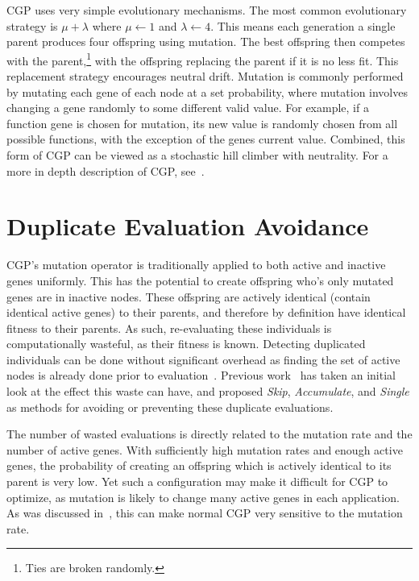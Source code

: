 \documentclass[journal]{IEEEtran}
\begin{document}
CGP uses very simple evolutionary mechanisms.  The most common evolutionary strategy
is $\mu + \lambda$ where $\mu \leftarrow 1$ and $\lambda \leftarrow 4$.
This means each generation a single parent produces four offspring using
mutation.  The best offspring then competes with the parent,\footnote{Ties are broken
randomly.} with the offspring
replacing the parent if it is no less fit.  This replacement strategy encourages
neutral drift.  Mutation
is commonly performed by mutating each gene of each node at a set probability, where mutation
involves changing a gene randomly to some different valid value.  For example,
if a function gene is chosen for mutation, its new value is randomly chosen from
all possible functions, with the exception of the genes current value.  Combined,
this form of CGP can be viewed as a stochastic hill climber with neutrality.
For a more in depth description of CGP, see~\cite{miller:2011:chapter2}.

\section{Duplicate Evaluation Avoidance}
\label{sec:duplicate}
CGP's mutation operator is traditionally applied to both active and inactive genes uniformly.
This has the
potential to create offspring who's only mutated genes are in inactive nodes.
These offspring are actively identical (contain identical active genes) to their
parents, and therefore by definition have identical fitness to their parents.
As such, re-evaluating these individuals is computationally wasteful, as their fitness
is known.
Detecting duplicated individuals can be done without significant overhead as
finding the set of active nodes is already done prior to
evaluation~\cite{vasicek:2012:efficient}.
Previous work~\cite{goldman:2013:cgpwaste} has taken an initial look at the
effect this waste can have, and proposed \emph{Skip}, \emph{Accumulate}, and
\emph{Single} as methods for avoiding or preventing these duplicate evaluations.

The number of wasted evaluations is
directly related to the mutation rate and the number of active genes.  With
sufficiently high mutation rates and enough active genes, the probability of
creating an offspring which is actively identical to its parent is very low.
Yet such a configuration may make it difficult for CGP to optimize, as mutation
is likely to change many active genes in each application.  As was discussed
in~\cite{goldman:2013:cgpwaste}, this can make normal CGP very sensitive to the
mutation rate.
\end{document}
